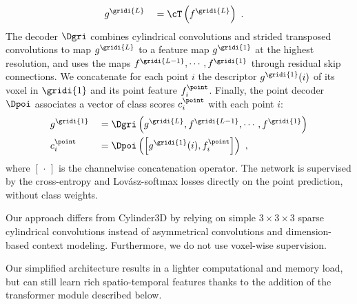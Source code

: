 \documentclass[runningheads]{tpls/llncs}
\begin{document}
\begin{alignat}{2}
    &g^{\gridi{L}}
    &&= \cT\left(f^{\gridi{L}}\right)~.
\end{alignat}
The decoder $\Dgri$ combines cylindrical convolutions and strided transposed convolutions to map $g^\gridi{L}$ to a feature map $g^\gridi{1}$ at the highest resolution, and uses the maps $f^\gridi{L-1}, \cdots, f^\gridi{1}$ through residual skip connections.
We concatenate for each point $i$ the descriptor $g^\gridi{1}(i)$ of its voxel in $\gridi{1}$ and its point feature $f^\point_i$. Finally, the point decoder $\Dpoi$ associates a vector of class scores  $c^\point_i$ with each point $i$:
\begin{alignat}{2}
    &g^{\gridi{1}} 
    &&= \Dgri\left(g^{\gridi{L}}, f^{\gridi{L-1}}, \cdots, f^{\gridi{1}} \right)\\
    &c^\point_i 
    &&= \Dpoi\left(\left[g^{\gridi{1}}(i), f^\point_i \right]\right)~,
\end{alignat}
where $[\,\cdot\,]$ is the channelwise concatenation operator. The network is supervised by the cross-entropy and Lov\'asz-softmax \cite{berman2018lovasz} losses directly on the point prediction, without class weights.

Our approach differs from Cylinder3D \cite{zhu2021cylindrical} by relying on simple $3\times3\times3$ sparse cylindrical convolutions instead of asymmetrical convolutions and dimension-based context modeling. Furthermore, we do not use voxel-wise supervision.

Our simplified architecture results in a lighter computational and memory load, but can still learn rich spatio-temporal features thanks to the addition of the transformer module described below.
\end{document}
